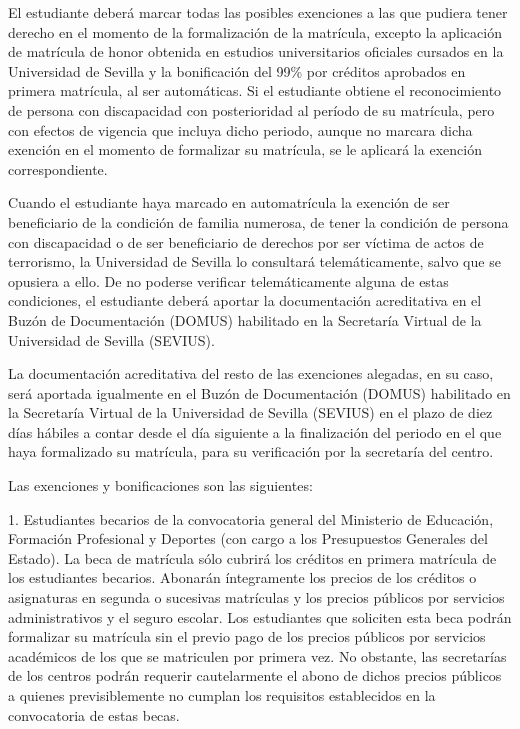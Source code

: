 \documentclass{article}
\begin{document}
\begin{itemize}
\begin{itemize}
\begin{scriptsize}
                  El estudiante deberá marcar todas las posibles exenciones a las que pudiera tener derecho en el momento de la formalización de la matrícula, excepto la aplicación de matrícula de honor obtenida en estudios universitarios oficiales cursados en la Universidad de Sevilla y la bonificación del 99\% por créditos aprobados en primera matrícula, al ser automáticas. Si el estudiante obtiene el reconocimiento de persona con discapacidad con posterioridad al período de su matrícula, pero con efectos de vigencia que incluya dicho periodo, aunque no marcara dicha exención en el momento de formalizar su matrícula, se le aplicará la exención correspondiente.

                  Cuando el estudiante haya marcado en automatrícula la exención de ser beneficiario de la condición de familia numerosa, de tener la condición de persona con discapacidad o de ser beneficiario de derechos por ser víctima de actos de terrorismo, la Universidad de Sevilla lo consultará telemáticamente, salvo que se opusiera a ello. De no poderse verificar telemáticamente alguna de estas condiciones, el estudiante deberá aportar la documentación acreditativa en el Buzón de Documentación (DOMUS) habilitado en la Secretaría Virtual de la Universidad de Sevilla (SEVIUS).

                  La documentación acreditativa del resto de las exenciones alegadas, en su caso, será aportada igualmente en el Buzón de Documentación (DOMUS) habilitado en la Secretaría Virtual de la Universidad de Sevilla (SEVIUS) en el plazo de diez días hábiles a contar desde el día siguiente a la finalización del periodo en el que haya formalizado su matrícula, para su verificación por la secretaría del centro.

                  Las exenciones y bonificaciones son las siguientes:

                  1. Estudiantes becarios de la convocatoria general del Ministerio de Educación, Formación Profesional y Deportes (con cargo a los Presupuestos Generales del Estado). La beca de matrícula sólo cubrirá los créditos en primera matrícula de los estudiantes becarios. Abonarán íntegramente los precios de los créditos o asignaturas en segunda o sucesivas matrículas y los precios públicos por servicios administrativos y el seguro escolar. Los estudiantes que soliciten esta beca podrán formalizar su matrícula sin el previo pago de los precios públicos por servicios académicos de los que se matriculen por primera vez. No obstante, las secretarías de los centros podrán requerir cautelarmente el abono de dichos precios públicos a quienes previsiblemente no cumplan los requisitos establecidos en la convocatoria de estas becas.


\end{scriptsize}
\end{itemize}
\end{itemize}
\end{document}
